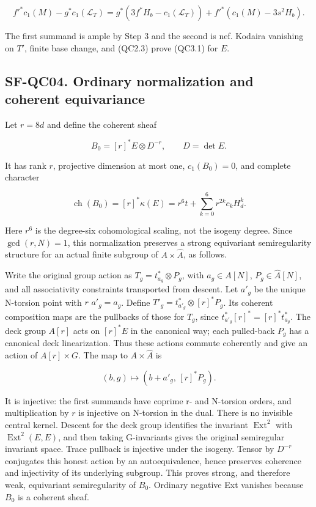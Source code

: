 \[
 f'^*c_1(M)-g^*c_1(\mathcal L_T)
 =g^*(3f^*H_b-c_1(\mathcal L_T))
       +f'^*(c_1(M)-3s^2H_b).
\]

The first summand is ample by Step 3 and the second is nef. Kodaira
vanishing on \(T'\), finite base change, and (QC2.3) prove (QC3.1) for
\(E\).

\subsection{SF-QC04. Ordinary normalization and coherent
equivariance}\label{SF-QC04}

Let \(r=8d\) and define the coherent sheaf

\[
 B_0=[r]^*E\otimes D^{-r},\qquad D=\det E.
 \tag{QC4.1}
\]

It has rank \(r\), projective dimension at most one, \(c_{1}(B_{0})=0\),
and complete character

\[
 \operatorname{ch}(B_0)=[r]^*\kappa(E)
       =r^6t+\sum_{k=0}^6 r^{2k}c_k H_d^k.
 \tag{QC4.2}
\]

Here \(r^{6}\) is the degree-six cohomological scaling, not the isogeny
degree. Since \(\operatorname{gcd}(r,N)=1\), this normalization
preserves a strong equivariant semiregularity structure for an actual
finite subgroup of \(A\times \widehat{A}\), as follows.

Write the original group action as \(T_g=t_{a_g}^*\otimes P_g\), with
\(a_g\in A[N]\), \(P_g\in \widehat{A}[N]\), and all associativity
constraints transported from descent. Let \(a'_g\) be the unique
N-torsion point with \(r\) \(a'_g=a_g\). Define
\(T'_g=t_{a'_g}^*\otimes[r]^*P_g\). Its coherent composition maps are
the pullbacks of those for \(T_g\), since
\(t_{a'_g}^*[r]^*=[r]^*t_{a_g}^*\). The deck group \(A[r]\) acts on
\([r]^*E\) in the canonical way; each pulled-back \(P_g\) has a
canonical deck linearization. Thus these actions commute coherently and
give an action of \(A[r]\times G\). The map to \(A\times \widehat{A}\)
is

\[
 (b,g)\longmapsto(b+a'_g,\,[r]^*P_g).
\]

It is injective: the first summands have coprime r- and N-torsion
orders, and multiplication by \(r\) is injective on N-torsion in the
dual. There is no invisible central kernel. Descent for the deck group
identifies the invariant \(\operatorname{Ext}^{2}\) with
\(\operatorname{Ext}^{2}(E,E)\), and then taking G-invariants gives the
original semiregular invariant space. Trace pullback is injective under
the isogeny. Tensor by \(D^{-r}\) conjugates this honest action by an
autoequivalence, hence preserves coherence and injectivity of its
underlying subgroup. This proves strong, and therefore weak, equivariant
semiregularity of \(B_{0}\). Ordinary negative Ext vanishes because
\(B_{0}\) is a coherent sheaf.

